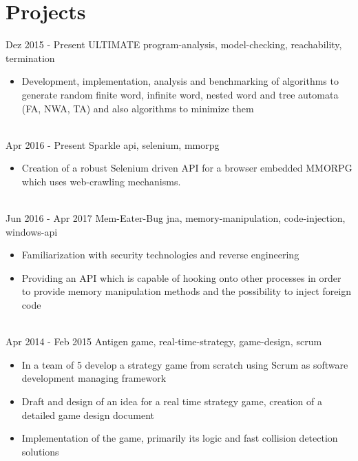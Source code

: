 \documentclass[letterpaper]{twentysecondcv} %
\begin{document}
\section{Projects}
\begin{twenty} %
	\twentyitem
    		{Dez 2015 -}
		{Present}
        		{ULTIMATE}
        		{}
        		{program-analysis, model-checking, reachability, termination}
        		{\begin{itemize}
        			\item Development, implementation, analysis and benchmarking of algorithms to generate random finite word,
        			infinite word, nested word and tree automata (FA, NWA, TA) and also algorithms to minimize them
        		\end{itemize}}\\
	\twentyitem
    		{Apr 2016 -}
		{Present}
        		{Sparkle}
        		{}
        		{api, selenium, mmorpg}
        		{\begin{itemize}
        			\item Creation of a robust Selenium driven API for a browser embedded MMORPG which uses web-crawling mechanisms.
        		\end{itemize}}\\
	\twentyitem
    		{Jun 2016 -}
		{Apr 2017}
        		{Mem-Eater-Bug}
        		{}
        		{jna, memory-manipulation, code-injection, windows-api}
        		{\begin{itemize}
        			\item Familiarization with security technologies and reverse engineering
        			\item Providing an API which is capable of hooking onto other processes in order to provide memory manipulation
        				methods and the possibility to inject foreign code
        		\end{itemize}}\\
	\twentyitem
    		{Apr 2014 -}
		{Feb 2015}
        		{Antigen}
        		{}
        		{game, real-time-strategy, game-design, scrum}
        		{\begin{itemize}
        			\item In a team of 5 develop a strategy game from scratch using Scrum as software development managing framework
        			\item Draft and design of an idea for a real time strategy game, creation of a detailed game design document
        			\item Implementation of the game, primarily its logic and fast collision detection solutions

\end{itemize}}
\end{twenty}
\end{document}
